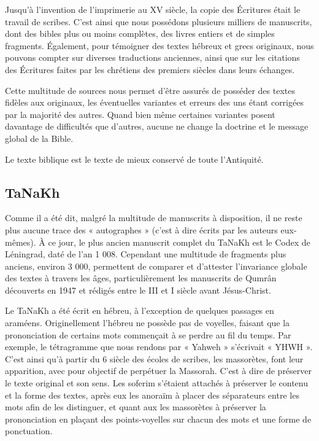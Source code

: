 \begin{small}
Jusqu'à l'invention de l'imprimerie au XV siècle, la copie des Écritures était le travail de scribes. C'est ainsi que nous possédons plusieurs milliers de manuscrits, dont des bibles plus ou moins complètes, des livres entiers et de simples fragments. Également, pour témoigner des textes hébreux et grecs originaux, nous pouvons compter sur diverses traductions anciennes, ainsi que sur les citations des Écritures faites par les chrétiens des premiers siècles dans leurs échanges.\bigskip

Cette multitude de sources nous permet d'être assurés de posséder des textes fidèles aux originaux, les éventuelles variantes et erreurs des uns étant corrigées par la majorité des autres. Quand bien même certaines variantes posent davantage de difficultés que d'autres, aucune ne change la doctrine et le message global de la Bible.\bigskip

Le texte biblique est le texte de mieux conservé de toute l'Antiquité.

\subsection*{TaNaKh}

Comme il a été dit, malgré la multitude de manuscrits à disposition, il ne reste plus aucune trace des « autographes » (c'est à dire écrits par les auteurs eux-mêmes). À ce jour, le plus ancien manuscrit complet du TaNaKh est le Codex de Léningrad, daté de l'an 1 008. Cependant une multitude de fragments plus anciens, environ 3 000, permettent de comparer et d'attester l'invariance globale des textes à travers les âges, particulièrement les manuscrits de Qumrân découverts en 1947 et rédigés entre le III et I siècle avant Jésus-Christ.\bigskip

Le TaNaKh a été écrit en hébreu, à l'exception de quelques passages en araméens. Originellement l'hébreu ne possède pas de voyelles, faisant que la prononciation de certains mots commençait à se perdre au fil du temps. Par exemple, le tétragramme que nous rendons par « Yahweh » s'écrivait « YHWH ». C'est ainsi qu'à partir du 6 siècle des écoles de scribes, les massorètes, font leur apparition, avec pour objectif de perpétuer la Massorah. C'est à dire de préserver le texte original et son sens. Les soferim s'étaient attachés à préserver le contenu et la forme des textes, après eux les anoraïm à placer des séparateurs entre les mots afin de les distinguer, et quant aux les massorètes à préserver la prononciation en plaçant des points-voyelles sur chacun des mots et une forme de ponctuation.\bigskip


\end{small}
